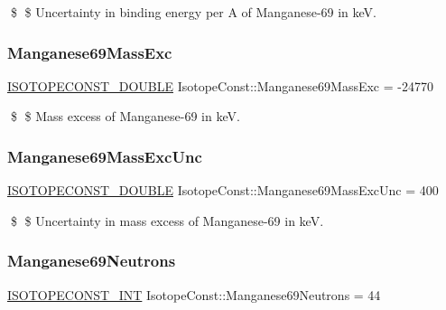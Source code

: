 \$ \$ Uncertainty in binding energy per A of Manganese-\/69 in keV. \mbox{\label{group___isotope_const-_manganese-_mn69_ga2a4f4cb2d435978bd4f5e0dd3291a67d}} 
\subsubsection{\texorpdfstring{Manganese69\+Mass\+Exc}{Manganese69MassExc}}
{\footnotesize\ttfamily \mbox{\hyperlink{group___isotope_const-_macros_ga8f45a7272ce02c0b4c65c44636ed719a}{I\+S\+O\+T\+O\+P\+E\+C\+O\+N\+S\+T\+\_\+\+D\+O\+U\+B\+LE}} Isotope\+Const\+::\+Manganese69\+Mass\+Exc = -\/24770}

\$ \$ Mass excess of Manganese-\/69 in keV. \mbox{\label{group___isotope_const-_manganese-_mn69_ga78988cc9c5000cd46580864c4aa011ec}} 
\subsubsection{\texorpdfstring{Manganese69\+Mass\+Exc\+Unc}{Manganese69MassExcUnc}}
{\footnotesize\ttfamily \mbox{\hyperlink{group___isotope_const-_macros_ga8f45a7272ce02c0b4c65c44636ed719a}{I\+S\+O\+T\+O\+P\+E\+C\+O\+N\+S\+T\+\_\+\+D\+O\+U\+B\+LE}} Isotope\+Const\+::\+Manganese69\+Mass\+Exc\+Unc = 400}

\$ \$ Uncertainty in mass excess of Manganese-\/69 in keV. \mbox{\label{group___isotope_const-_manganese-_mn69_gac47ff05cfd9869512fabb56941441e6d}} 
\subsubsection{\texorpdfstring{Manganese69\+Neutrons}{Manganese69Neutrons}}
{\footnotesize\ttfamily \mbox{\hyperlink{group___isotope_const-_macros_ga5f18360b3e99483a35c32d789e62621c}{I\+S\+O\+T\+O\+P\+E\+C\+O\+N\+S\+T\+\_\+\+I\+NT}} Isotope\+Const\+::\+Manganese69\+Neutrons = 44}

